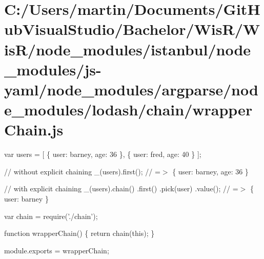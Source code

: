 \hypertarget{_c_1_2_users_2martin_2_documents_2_git_hub_visual_studio_2_bachelor_2_wis_r_2_wis_r_2node_module764979b6be2b55b0642ab6ab07ed566d}{}\section{C\+:/\+Users/martin/\+Documents/\+Git\+Hub\+Visual\+Studio/\+Bachelor/\+Wis\+R/\+Wis\+R/node\+\_\+modules/istanbul/node\+\_\+modules/js-\/yaml/node\+\_\+modules/argparse/node\+\_\+modules/lodash/chain/wrapper\+Chain.\+js}
var users = \mbox{[} \{ \textquotesingle{}user\textquotesingle{}\+: \textquotesingle{}barney\textquotesingle{}, \textquotesingle{}age\textquotesingle{}\+: 36 \}, \{ \textquotesingle{}user\textquotesingle{}\+: \textquotesingle{}fred\textquotesingle{}, \textquotesingle{}age\textquotesingle{}\+: 40 \} \mbox{]};

// without explicit chaining \+\_\+(users).first(); // =$>$ \{ \textquotesingle{}user\textquotesingle{}\+: \textquotesingle{}barney\textquotesingle{}, \textquotesingle{}age\textquotesingle{}\+: 36 \}

// with explicit chaining \+\_\+(users).chain() .first() .pick(\textquotesingle{}user\textquotesingle{}) .value(); // =$>$ \{ \textquotesingle{}user\textquotesingle{}\+: \textquotesingle{}barney\textquotesingle{} \}


\begin{DoxyCodeInclude}
var chain = require(\textcolor{stringliteral}{'./chain'});

\textcolor{keyword}{function} wrapperChain() \{
  \textcolor{keywordflow}{return} chain(\textcolor{keyword}{this});
\}

module.exports = wrapperChain;
\end{DoxyCodeInclude}
 